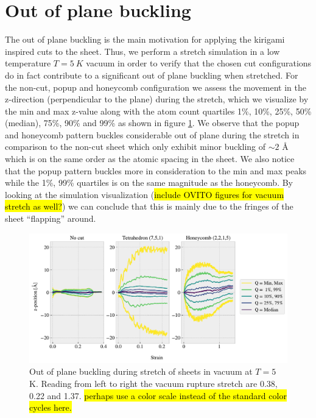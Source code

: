 \section{Out of plane buckling}

The out of plane buckling is the main motivation for applying the kirigami
inspired cuts to the sheet. Thus, we perform a stretch simulation in a low
temperature $T = \SI{5}{K}$ vacuum in order to verify that the chosen cut
configurations do in fact contribute to a significant out of plane buckling when
stretched. For the non-cut, popup and honeycomb configuration we assess the
movement in the z-direction (perpendicular to the plane) during the stretch,
which we visualize by the min and max z-value along with the atom count
quartiles 1\%, 10\%, 25\%, 50\% (median), 75\%, 90\% and 99\% as shown in figure
\cref{fig:buckling_quartiles}. We observe that the popup and honeycomb pattern
buckles considerable out of plane during the stretch in comparison to the non-cut sheet which only exhibit minor buckling of $\sim 2$ Å which is on the same order as the
atomic spacing in the sheet. We also notice that the popup pattern
buckles more in consideration to the min and max peaks while the 1\%, 99\%
quartiles is on the same magnitude as the honeycomb. By looking at the simulation visualization
(\hl{include OVITO figures for vacuum stretch as well?}) we can conclude that this is mainly due to the fringes
of the sheet ``flapping'' around. 


\begin{figure}[H]
  \centering
  \includegraphics[width=\linewidth]{figures/baseline/vacuum_normal_buckling}
  \caption{Out of plane buckling during stretch of sheets in vacuum at $T = 5$ K. Reading from left to right the vacuum rupture stretch are 0.38, 0.22 and 1.37. \hl{perhaps use a color scale instead of the standard color cycles here.}}
  \label{fig:buckling_quartiles}
\end{figure}


